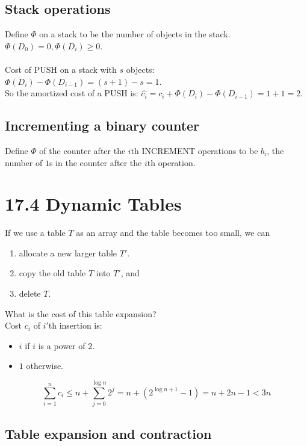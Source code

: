 \documentclass[a4paper]{article}
\begin{document}
\subsection*{Stack operations}
Define $\Phi$ on a stack to be the number of objects in the stack. $\Phi(D_0)=0, \Phi(D_i)\geq 0$.\\
\\
Cost of PUSH on a stack with $s$ objects: $\Phi(D_i)-\Phi(D_{i-1})=(s+1)-s=1$.\\
So the amortized cost of a PUSH is: $\hat{c_i}=c_i+\Phi(D_i)-\Phi(D_{i-1})=1+1=2$.

\subsection*{Incrementing a binary counter}
Define $\Phi$ of the counter after the $i$th INCREMENT operations to be $b_i$, the number of $1$s in the counter after the $i$th operation.
\section*{17.4 Dynamic Tables}
If we use a table $T$ as an array and the table becomes too small, we can
\begin{enumerate}
    \item allocate a new larger table $T'$.
    \item copy the old table $T$ into $T'$, and
    \item delete $T$.
\end{enumerate}
What is the cost of this table expansion?\\
Cost $c_i$ of $i'$th insertion is:
\begin{itemize}
    \item $i$ if $i$ is a power of $2$.
    \item $1$ otherwise.
\end{itemize}
\begin{equation*}
\sum_{i=1}^{n}{c_i}\leq n+\sum_{j=0}^{\log{n}}{2^j}=n+(2^{\log{n+1}}-1)=n+2n-1<3n
\end{equation*}
\subsection*{Table expansion and contraction}
\end{document}
